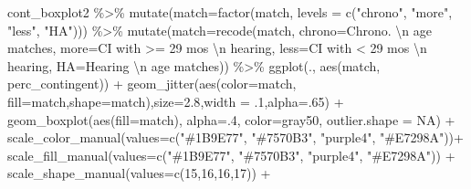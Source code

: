 \documentclass[
]{article}
\newenvironment{Shaded}{\begin{snugshade}}{\end{snugshade}}
\newcommand{\AttributeTok}[1]{\textcolor[rgb]{0.77,0.63,0.00}{#1}}
\newcommand{\ConstantTok}[1]{\textcolor[rgb]{0.00,0.00,0.00}{#1}}
\newcommand{\DecValTok}[1]{\textcolor[rgb]{0.00,0.00,0.81}{#1}}
\newcommand{\FloatTok}[1]{\textcolor[rgb]{0.00,0.00,0.81}{#1}}
\newcommand{\FunctionTok}[1]{\textcolor[rgb]{0.00,0.00,0.00}{#1}}
\newcommand{\NormalTok}[1]{#1}
\newcommand{\SpecialCharTok}[1]{\textcolor[rgb]{0.00,0.00,0.00}{#1}}
\newcommand{\StringTok}[1]{\textcolor[rgb]{0.31,0.60,0.02}{#1}}
\begin{document}
\begin{Shaded}
\begin{Highlighting}[]
\NormalTok{cont\_boxplot2 }\SpecialCharTok{\%\textgreater{}\%}
  \FunctionTok{mutate}\NormalTok{(}\AttributeTok{match=}\FunctionTok{factor}\NormalTok{(match, }\AttributeTok{levels =} \FunctionTok{c}\NormalTok{(}\StringTok{"chrono"}\NormalTok{, }\StringTok{"more"}\NormalTok{, }\StringTok{"less"}\NormalTok{, }\StringTok{"HA"}\NormalTok{))) }\SpecialCharTok{\%\textgreater{}\%}
   \FunctionTok{mutate}\NormalTok{(}\AttributeTok{match=}\FunctionTok{recode}\NormalTok{(match,}
                      \AttributeTok{chrono=}\StringTok{\textquotesingle{}Chrono. }\SpecialCharTok{\textbackslash{}n}\StringTok{ age matches\textquotesingle{}}\NormalTok{,}
                      \AttributeTok{more=}\StringTok{\textquotesingle{}CI with \textgreater{}= 29 mos }\SpecialCharTok{\textbackslash{}n}\StringTok{ hearing\textquotesingle{}}\NormalTok{,}
                      \AttributeTok{less=}\StringTok{\textquotesingle{}CI with \textless{} 29 mos }\SpecialCharTok{\textbackslash{}n}\StringTok{ hearing\textquotesingle{}}\NormalTok{,}
                      \AttributeTok{HA=}\StringTok{\textquotesingle{}Hearing }\SpecialCharTok{\textbackslash{}n}\StringTok{ age matches\textquotesingle{}}\NormalTok{)) }\SpecialCharTok{\%\textgreater{}\%}
\FunctionTok{ggplot}\NormalTok{(., }\FunctionTok{aes}\NormalTok{(match, perc\_contingent)) }\SpecialCharTok{+}
  \FunctionTok{geom\_jitter}\NormalTok{(}\FunctionTok{aes}\NormalTok{(}\AttributeTok{color=}\NormalTok{match, }\AttributeTok{fill=}\NormalTok{match,}\AttributeTok{shape=}\NormalTok{match),}\AttributeTok{size=}\FloatTok{2.8}\NormalTok{,}\AttributeTok{width =}\NormalTok{ .}\DecValTok{1}\NormalTok{,}\AttributeTok{alpha=}\NormalTok{.}\DecValTok{65}\NormalTok{) }\SpecialCharTok{+}
  \FunctionTok{geom\_boxplot}\NormalTok{(}\FunctionTok{aes}\NormalTok{(}\AttributeTok{fill=}\NormalTok{match), }\AttributeTok{alpha=}\NormalTok{.}\DecValTok{4}\NormalTok{, }\AttributeTok{color=}\StringTok{\textquotesingle{}gray50\textquotesingle{}}\NormalTok{, }\AttributeTok{outlier.shape =} \ConstantTok{NA}\NormalTok{) }\SpecialCharTok{+}
  \FunctionTok{scale\_color\_manual}\NormalTok{(}\AttributeTok{values=}\FunctionTok{c}\NormalTok{(}\StringTok{"\#1B9E77"}\NormalTok{, }\StringTok{"\#7570B3"}\NormalTok{, }\StringTok{"purple4"}\NormalTok{, }\StringTok{"\#E7298A"}\NormalTok{))}\SpecialCharTok{+}
  \FunctionTok{scale\_fill\_manual}\NormalTok{(}\AttributeTok{values=}\FunctionTok{c}\NormalTok{(}\StringTok{"\#1B9E77"}\NormalTok{, }\StringTok{"\#7570B3"}\NormalTok{, }\StringTok{"purple4"}\NormalTok{, }\StringTok{"\#E7298A"}\NormalTok{)) }\SpecialCharTok{+}
  \FunctionTok{scale\_shape\_manual}\NormalTok{(}\AttributeTok{values=}\FunctionTok{c}\NormalTok{(}\DecValTok{15}\NormalTok{,}\DecValTok{16}\NormalTok{,}\DecValTok{16}\NormalTok{,}\DecValTok{17}\NormalTok{)) }\SpecialCharTok{+}

\end{Highlighting}
\end{Shaded}
\end{document}
